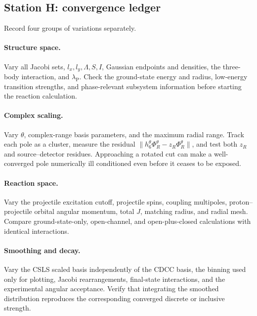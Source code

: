 \subsection{Station H: convergence ledger}
\label{subsec:he6-convergence-ledger}

Record four groups of variations separately.

\paragraph{Structure space.}
Vary all Jacobi sets, $l_x,l_y,\Lambda,S,I$, Gaussian endpoints and densities,
the three-body interaction, and $\lambda_{\mathrm P}$.  Check the ground-state
energy and radius, low-energy transition strengths, and phase-relevant
subsystem information before starting the reaction calculation.

\paragraph{Complex scaling.}
Vary $\theta$, complex-range basis parameters, and the maximum radial range.
Track each pole as a cluster, measure the residual
$\|h_6^\theta\Phi_R^\theta-z_R\Phi_R^\theta\|$, and test both
$z_R$ and source--detector residues.  Approaching a rotated cut can make a
well-converged pole numerically ill conditioned even before it ceases to be
exposed.

\paragraph{Reaction space.}
Vary the projectile excitation cutoff, projectile spins, coupling multipoles,
proton--projectile orbital angular momentum, total $J$, matching radius, and
radial mesh.  Compare ground-state-only, open-channel, and open-plus-closed
calculations with identical interactions.

\paragraph{Smoothing and decay.}
Vary the CSLS scaled basis independently of the CDCC basis, the binning used
only for plotting, Jacobi rearrangements, final-state interactions, and the
experimental angular acceptance.  Verify that integrating the smoothed
distribution reproduces the corresponding converged discrete or inclusive
strength.

